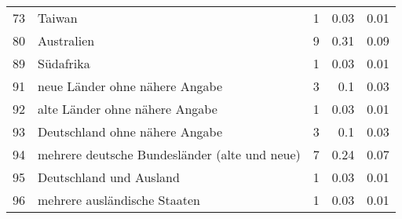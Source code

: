 \begin{longtable}{lXrrr}
        73 & \multicolumn{1}{X}{Taiwan} & %
          \num{1} &
          \num[round-mode=places,round-precision=2]{0.03} &
          \num[round-mode=places,round-precision=2]{0.01} \\

        80 & \multicolumn{1}{X}{Australien} & %
          \num{9} &
          \num[round-mode=places,round-precision=2]{0.31} &
          \num[round-mode=places,round-precision=2]{0.09} \\

        89 & \multicolumn{1}{X}{Südafrika} & %
          \num{1} &
          \num[round-mode=places,round-precision=2]{0.03} &
          \num[round-mode=places,round-precision=2]{0.01} \\

        91 & \multicolumn{1}{X}{neue Länder ohne nähere Angabe} & %
          \num{3} &
          \num[round-mode=places,round-precision=2]{0.1} &
          \num[round-mode=places,round-precision=2]{0.03} \\

        92 & \multicolumn{1}{X}{alte Länder ohne nähere Angabe} & %
          \num{1} &
          \num[round-mode=places,round-precision=2]{0.03} &
          \num[round-mode=places,round-precision=2]{0.01} \\

        93 & \multicolumn{1}{X}{Deutschland ohne nähere Angabe} & %
          \num{3} &
          \num[round-mode=places,round-precision=2]{0.1} &
          \num[round-mode=places,round-precision=2]{0.03} \\

        94 & \multicolumn{1}{X}{mehrere deutsche Bundesländer (alte und neue)} & %
          \num{7} &
          \num[round-mode=places,round-precision=2]{0.24} &
          \num[round-mode=places,round-precision=2]{0.07} \\

        95 & \multicolumn{1}{X}{Deutschland und Ausland} & %
          \num{1} &
          \num[round-mode=places,round-precision=2]{0.03} &
          \num[round-mode=places,round-precision=2]{0.01} \\

        96 & \multicolumn{1}{X}{mehrere ausländische Staaten} & %
          \num{1} &
          \num[round-mode=places,round-precision=2]{0.03} &
          \num[round-mode=places,round-precision=2]{0.01} \\


\end{longtable}
